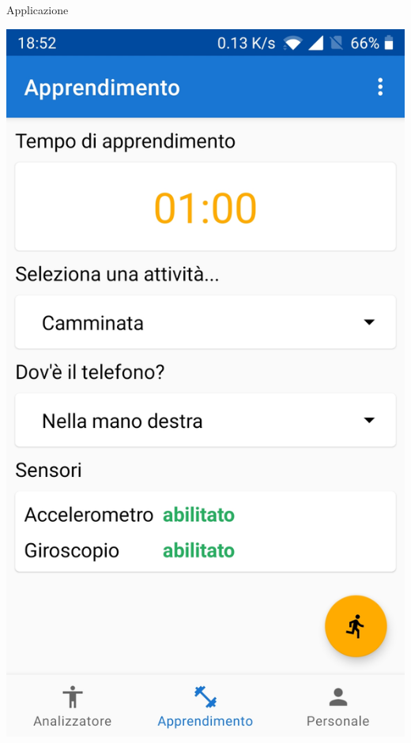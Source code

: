 \begin{tframe}{Applicazione}
\begin{minipage}{0.65\textwidth}
        \centering\includegraphics[scale = 0.06]{assets/images/screenshots/apprendimento.jpg}

\end{minipage}
\end{tframe}
